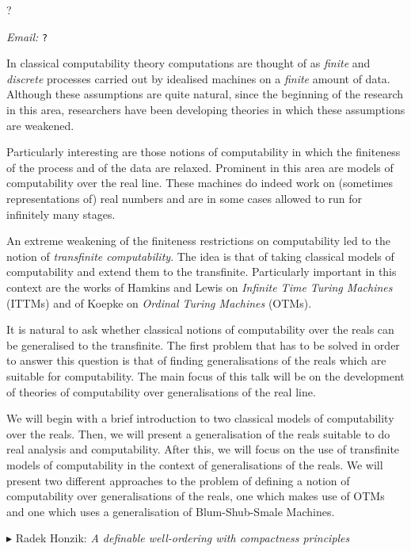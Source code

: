 \documentclass[a4paper]{amsart}
\theoremstyle{remark}
\newcommand{\vsp}{\vspace{20pt}}
\begin{document}
\noindent 
? 

\noindent 
\emph{Email:} \texttt{?}

In classical computability theory computations are thought of as \emph{finite} and \emph{discrete} processes carried out by idealised machines on a \emph{finite} amount of data. Although these assumptions are quite natural, since the beginning of the research in this area, researchers have been developing theories in which these assumptions are weakened.

Particularly interesting are those notions of computability in which the finiteness of the process and of the data are relaxed. Prominent in this area are models of computability over the real line. These machines do indeed work on (sometimes representations of) real numbers and are in some cases allowed to run for infinitely many stages. 


An extreme weakening of the finiteness restrictions on computability led to the notion of \emph{transfinite computability}. The idea is that of taking classical models of computability and extend them to the transfinite. Particularly important in this context are the works of Hamkins and Lewis on \emph{Infinite Time Turing Machines} (ITTMs) and of Koepke on \emph{Ordinal Turing Machines} (OTMs).


It is natural to ask whether classical notions of computability over the reals can be generalised to the transfinite. The first problem that has to be solved in order to answer this question is that of finding generalisations of the reals which are suitable for computability. The main focus of this talk will be on the development of theories of computability over generalisations of the real line. 

We will begin with a brief introduction to two classical models of computability over the reals. Then, we will present a generalisation of the reals suitable to do real analysis and computability. After this, we will focus on the use of transfinite models of computability in the context of generalisations of the reals. We will present two different approaches to the problem of defining a notion of computability over generalisations of the reals, one which makes use of OTMs and one which uses a generalisation of Blum-Shub-Smale Machines. 








\vsp 

\noindent 
$\blacktriangleright$ Radek Honzik: \emph{A definable well-ordering with compactness principles} 
\end{document}
